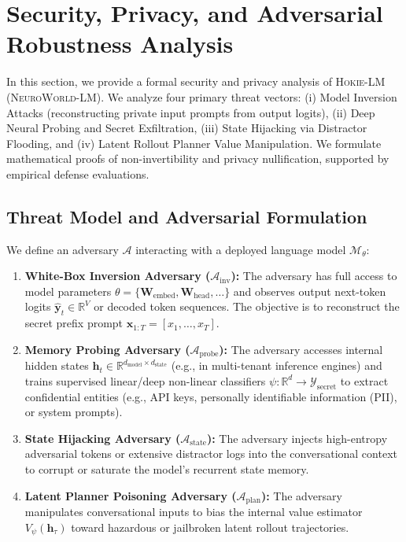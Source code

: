 \section{Security, Privacy, and Adversarial Robustness Analysis}
\label{sec:security_analysis}

In this section, we provide a formal security and privacy analysis of \textsc{Hokie-LM} (\textsc{NeuroWorld-LM}). We analyze four primary threat vectors: (i) Model Inversion Attacks (reconstructing private input prompts from output logits), (ii) Deep Neural Probing and Secret Exfiltration, (iii) State Hijacking via Distractor Flooding, and (iv) Latent Rollout Planner Value Manipulation. We formulate mathematical proofs of non-invertibility and privacy nullification, supported by empirical defense evaluations.

\subsection{Threat Model and Adversarial Formulation}

We define an adversary $\mathcal{A}$ interacting with a deployed language model $\mathcal{M}_\theta$:
\begin{enumerate}[leftmargin=*]
    \item \textbf{White-Box Inversion Adversary ($\mathcal{A}_{\mathrm{inv}}$):} The adversary has full access to model parameters $\theta = \{\mathbf{W}_{\mathrm{embed}}, \mathbf{W}_{\mathrm{head}}, \dots\}$ and observes output next-token logits $\hat{\mathbf{y}}_t \in \mathbb{R}^V$ or decoded token sequences. The objective is to reconstruct the secret prefix prompt $\mathbf{x}_{1:T} = [x_1, \dots, x_T]$.
    \item \textbf{Memory Probing Adversary ($\mathcal{A}_{\mathrm{probe}}$):} The adversary accesses internal hidden states $\mathbf{h}_t \in \mathbb{R}^{d_{\mathrm{model}} \times d_{\mathrm{state}}}$ (e.g., in multi-tenant inference engines) and trains supervised linear/deep non-linear classifiers $\psi: \mathbb{R}^{d} \rightarrow \mathcal{Y}_{\mathrm{secret}}$ to extract confidential entities (e.g., API keys, personally identifiable information (PII), or system prompts).
    \item \textbf{State Hijacking Adversary ($\mathcal{A}_{\mathrm{state}}$):} The adversary injects high-entropy adversarial tokens or extensive distractor logs into the conversational context to corrupt or saturate the model's recurrent state memory.
    \item \textbf{Latent Planner Poisoning Adversary ($\mathcal{A}_{\mathrm{plan}}$):} The adversary manipulates conversational inputs to bias the internal value estimator $V_\psi(\mathbf{h}_\tau)$ toward hazardous or jailbroken latent rollout trajectories.
\end{enumerate}

